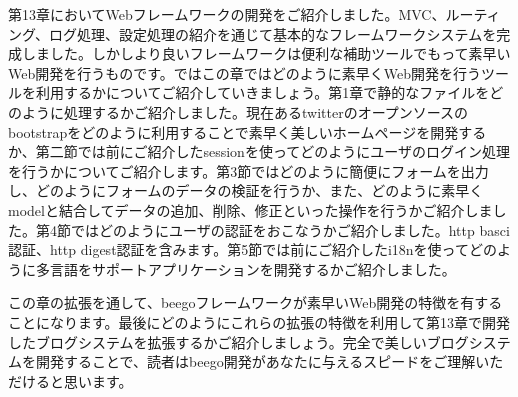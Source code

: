 第13章においてWebフレームワークの開発をご紹介しました。MVC、ルーティング、ログ処理、設定処理の紹介を通じて基本的なフレームワークシステムを完成しました。しかしより良いフレームワークは便利な補助ツールでもって素早いWeb開発を行うものです。ではこの章ではどのように素早くWeb開発を行うツールを利用するかについてご紹介していきましょう。第1章で静的なファイルをどのように処理するかご紹介しました。現在あるtwitterのオープンソースのbootstrapをどのように利用することで素早く美しいホームページを開発するか、第二節では前にご紹介したsessionを使ってどのようにユーザのログイン処理を行うかについてご紹介します。第3節ではどのように簡便にフォームを出力し、どのようにフォームのデータの検証を行うか、また、どのように素早くmodelと結合してデータの追加、削除、修正といった操作を行うかご紹介しました。第4節ではどのようにユーザの認証をおこなうかご紹介しました。http basci認証、http digest認証を含みます。第5節では前にご紹介したi18nを使ってどのように多言語をサポートアプリケーションを開発するかご紹介しました。

この章の拡張を通して、beegoフレームワークが素早いWeb開発の特徴を有することになります。最後にどのようにこれらの拡張の特徴を利用して第13章で開発したブログシステムを拡張するかご紹介しましょう。完全で美しいブログシステムを開発することで、読者はbeego開発があなたに与えるスピードをご理解いただけると思います。
